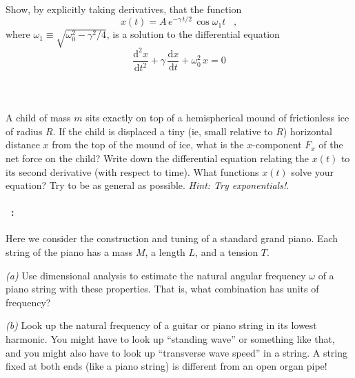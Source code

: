 \documentclass[12pt]{article}
\newcounter{problem}
\begin{document}
\paragraph{\problemname~\theproblem}

Show, by explicitly taking derivatives, that the function
\begin{equation}
x(t) = A\,e^{-\gamma\,t/2}\,\cos\omega_1 t \;\;\; ,
\end{equation}
where $\omega_1\equiv\sqrt{\omega_0^2-\gamma^2/4}$, is a solution
to the differential equation
\begin{equation}
\frac{\mathrm{d}^2x}{\mathrm{d}t^2}
 + \gamma\,\frac{\mathrm{d}x}{\mathrm{d}t}
 + \omega_0^2\,x = 0
\end{equation}

\paragraph{\problemname~\theproblem}

A child of mass $m$ sits exactly on top of a hemispherical mound of
frictionless ice of radius $R$.  If the child is displaced a tiny (ie,
small relative to $R$) horizontal distance $x$ from the top of the
mound of ice, what is the $x$-component $F_x$ of the net force on the
child?  Write down the differential equation relating the $x(t)$ to
its second derivative (with respect to time).  What functions $x(t)$
solve your equation?  Try to be as general as possible.  \emph{Hint:
Try exponentials!}.

\paragraph{\problemname~\theproblem:}%
Here we consider the construction and tuning of a standard grand piano.
Each string of the piano has a mass $M$, a length $L$, and a tension $T$.

\textsl{(a)} Use dimensional analysis to estimate the natural angular
frequency $\omega$ of a piano string with these properties. That is,
what combination has units of frequency?

\textsl{(b)} Look up the natural frequency of a guitar or piano string
in its lowest harmonic. You might have to look up ``standing wave'' or
something like that, and you might also have to look up ``transverse
wave speed'' in a string. A string fixed at both ends (like a piano
string) is different from an open organ pipe!
\end{document}
